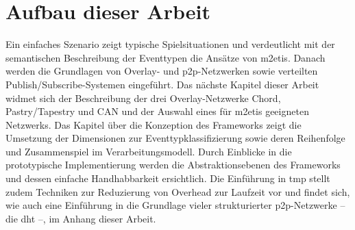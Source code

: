 \section*{Aufbau dieser Arbeit}
Ein einfaches Szenario zeigt typische Spielsituationen und verdeutlicht mit der semantischen Beschreibung der Eventtypen die Ansätze von \ac{m2etis}. Danach werden die Grundlagen von Overlay- und p2p-Netzwerken sowie verteilten Publish/Subscribe-Systemen eingeführt. Das nächste Kapitel dieser Arbeit widmet sich der Beschreibung der drei Overlay-Netzwerke Chord, Pastry/Tapestry und CAN und der Auswahl eines für \ac{m2etis} geeigneten Netzwerks. Das Kapitel über die Konzeption des Frameworks zeigt die Umsetzung der Dimensionen zur Eventtypklassifizierung sowie deren Reihenfolge und Zusammenspiel im Verarbeitungsmodell. Durch Einblicke in die prototypische Implementierung werden die Abstraktionsebenen des Frameworks und dessen einfache Handhabbarkeit ersichtlich. Die Einführung in \ac{tmp} stellt zudem Techniken zur Reduzierung von Overhead zur Laufzeit vor und findet sich, wie auch eine Einführung in die Grundlage vieler strukturierter \ac{p2p}-Netzwerke -- die \ac{dht} --, im Anhang dieser Arbeit.
